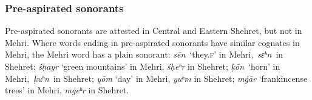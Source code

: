\documentclass[output=paper]{langscibook}
\begin{document}
\begin{table}
\caption{Shehret consonantal phoneme table for Central and Eastern dialects}
\label{tab:watson:2}
\end{table}
\subsubsection{Pre-aspirated sonorants}
\label{sec:watson:2.2.1}
Pre-aspirated sonorants are attested in Central and Eastern Shehret, but not in Mehri. Where words ending in pre-aspirated sonorants have similar cognates in Mehri, the Mehri word has a plain sonorant: \textit{sēn}~‘they.\textsc{f}’ in Mehri,~\textit{sɛʰn}~in Shehret; \textit{śḥayr} ‘green mountains’ in Mehri, \textit{śḥeʰr} in Shehret; \textit{ḳōn}~‘horn’ in Mehri,~\textit{ḳuʰn}~in Shehret; \textit{yōm} ‘day’ in Mehri, \textit{yuʰm} in Shehret; \textit{m\.gār} ‘frankincense trees’ in Mehri, \textit{m\.geʰr} in Shehret.
\end{document}

